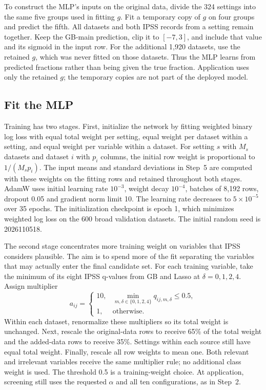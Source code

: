 \documentclass[10pt,letterpaper]{article}
\begin{document}
To construct the MLP's inputs on the original data, divide the 324 settings
into the same five groups used in fitting $g$. Fit a temporary copy of $g$
on four groups and predict the fifth. All datasets and both IPSS records
from a setting remain together. Keep the GB-main prediction, clip it to
$[-7,3]$, and include that value and its sigmoid in the input row. For the
additional 1,920 datasets, use the retained $g$, which was never fitted on
those datasets. Thus the MLP learns from predicted fractions rather than
being given the true fraction. Application uses only the retained $g$;
the temporary copies are not part of the deployed model.


\subsection{Fit the MLP}
Training has two stages. First, initialize the network by fitting weighted
binary log loss with equal total weight per setting, equal weight per
dataset within a setting, and equal weight per variable within a dataset.
For setting $s$ with $M_s$ datasets and dataset $i$ with $p_i$ columns,
the initial row weight is proportional to $1/(M_sp_i)$. The input means
and standard deviations in Step~5 are computed with these weights on
the fitting rows and retained throughout both stages. AdamW uses initial
learning rate $10^{-3}$, weight decay $10^{-4}$, batches of 8,192 rows,
dropout 0.05 and gradient norm limit 10. The learning rate decreases to
$5\times10^{-5}$ over 35 epochs. The initialization checkpoint is epoch 1,
which minimizes weighted log loss on the 600 broad validation datasets.
The initial random seed is 2026110518.

The second stage concentrates more training weight on variables that
IPSS considers plausible. The aim is to spend more of the fit separating
the variables that may actually enter the final candidate set. For each
training variable, take the minimum of its eight IPSS q-values from
GB and Lasso at $\delta=0,1,2,4$. Assign multiplier
\[
 a_{ij}=\begin{cases}10,&\min_{m,\delta\in\{0,1,2,4\}}q_{ij,m,\delta}\le0.5,\\
 1,&\text{otherwise}.\end{cases}
\]
Within each dataset, renormalize these multipliers so its total weight
is unchanged. Next, rescale the original-data rows to receive 65\% of
the total weight and the added-data rows to receive 35\%. Settings within
each source still have equal total weight. Finally, rescale all row
weights to mean one. Both relevant and irrelevant variables receive the
same multiplier rule; no additional class weight is used.
The threshold 0.5 is a training-weight choice. At application, screening
still uses the requested $\alpha$ and all ten configurations, as in Step~2.
\end{document}
